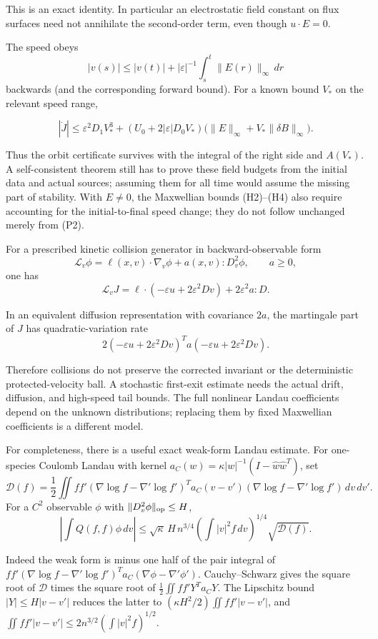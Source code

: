This is an exact identity. In particular an electrostatic field constant
on flux surfaces need not annihilate the second-order term, even though
\(u\cdot E=0\).

The speed obeys \[
|v(s)|\le |v(t)|+|\varepsilon|^{-1}
\int_s^t\|E(r)\|_\infty\,dr
\] backwards (and the corresponding forward bound). For a known bound
\(V_*\) on the relevant speed range,

\[
|\dot J|\le
\varepsilon^2D_1V_*^3+
(U_0+2|\varepsilon|D_0V_*)
\big(\|E\|_\infty+V_*\|\delta B\|_\infty\big).
\tag{P2}
\]

Thus the orbit certificate survives with the integral of the right side
and \(A(V_*)\). A self-consistent theorem still has to prove these field
budgets from the initial data and actual sources; assuming them for all
time would assume the missing part of stability. With \(E\ne0\), the
Maxwellian bounds (H2)--(H4) also require accounting for the
initial-to-final speed change; they do not follow unchanged merely from
(P2).

For a prescribed kinetic collision generator in backward-observable form
\[
\mathcal L_v\phi=\ell(x,v)\cdot\nabla_v\phi
                 +a(x,v):D_v^2\phi,\qquad a\ge0,
\] one has \[
\mathcal L_vJ
=\ell\cdot(-\varepsilon u+2\varepsilon^2Dv)
 +2\varepsilon^2a:D.
\tag{P3}
\]

In an equivalent diffusion representation with covariance \(2a\), the
martingale part of \(J\) has quadratic-variation rate \[
2(-\varepsilon u+2\varepsilon^2Dv)^T
 a(-\varepsilon u+2\varepsilon^2Dv).
\tag{P4}
\]

Therefore collisions do not preserve the corrected invariant or the
deterministic protected-velocity ball. A stochastic first-exit estimate
needs the actual drift, diffusion, and high-speed tail bounds. The full
nonlinear Landau coefficients depend on the unknown distributions;
replacing them by fixed Maxwellian coefficients is a different model.

For completeness, there is a useful exact weak-form Landau estimate. For
one-species Coulomb Landau with kernel
\(a_C(w)=\kappa|w|^{-1}(I-\hat w\hat w^T)\), set \[
\mathcal D(f)=\frac12\iint ff'
(\nabla\log f-\nabla'\log f')^Ta_C(v-v')
(\nabla\log f-\nabla'\log f')\,dv\,dv'.
\] For a \(C^2\) observable \(\phi\) with
\(\|D_v^2\phi\|_{\rm op}\le H\), \[
\left|\int Q(f,f)\phi\,dv\right|
\le \sqrt{\kappa}\,H\,
n^{3/4}\left(\int|v|^2f\,dv\right)^{1/4}
\sqrt{\mathcal D(f)}.
\tag{P5}
\]

Indeed the weak form is minus one half of the pair integral of
\(ff'(\nabla\log f-\nabla'\log f')^Ta_C(\nabla\phi-\nabla'\phi')\).
Cauchy--Schwarz gives the square root of \(\mathcal D\) times the square
root of \(\frac12\iint ff'Y^Ta_CY\). The Lipschitz bound
\(|Y|\le H|v-v'|\) reduces the latter to
\((\kappa H^2/2)\iint ff'|v-v'|\), and
\(\iint ff'|v-v'|\le2n^{3/2}(\int|v|^2f)^{1/2}\).

